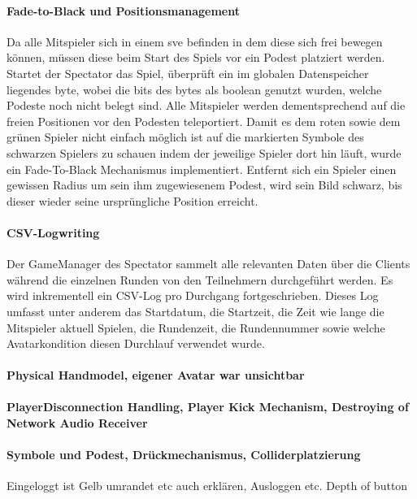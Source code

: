 \documentclass[a4paper,11pt]{article}%
\renewcommand{\\}{\vspace*{0.5\baselineskip} \newline}
\begin{document}
\paragraph{Fade-to-Black und Positionsmanagement}
	Da alle Mitspieler sich in einem \ac{sve} befinden in dem diese sich frei bewegen können, müssen diese beim Start des Spiels vor ein Podest platziert werden. Startet der Spectator das Spiel, überprüft ein im globalen Datenspeicher liegendes byte, wobei die bits des bytes als boolean genutzt wurden, welche Podeste noch nicht belegt sind. Alle Mitspieler werden dementsprechend auf die freien Positionen vor den Podesten teleportiert.
Damit es dem roten sowie dem grünen Spieler nicht einfach möglich ist auf die markierten Symbole des schwarzen Spielers zu schauen indem der jeweilige Spieler dort hin läuft, wurde ein Fade-To-Black Mechanismus implementiert. Entfernt sich ein Spieler einen gewissen Radius um sein ihm zugewiesenem Podest, wird sein Bild schwarz, bis dieser wieder seine ursprüngliche Position erreicht.

\paragraph{CSV-Logwriting}
Der GameManager des Spectator sammelt alle relevanten Daten über die Clients während die einzelnen Runden von den Teilnehmern durchgeführt werden. Es wird inkrementell ein CSV-Log pro Durchgang fortgeschrieben. Dieses Log umfasst unter anderem das Startdatum, die Startzeit, die Zeit wie lange die Mitspieler aktuell Spielen, die Rundenzeit, die Rundennummer %
sowie welche Avatarkondition diesen Durchlauf verwendet wurde.

\paragraph{Physical Handmodel, eigener Avatar war unsichtbar}

\paragraph{PlayerDisconnection Handling, Player Kick Mechanism, Destroying of Network Audio Receiver}

\paragraph{Symbole und Podest, Drückmechanismus, Colliderplatzierung}
Eingeloggt ist Gelb umrandet etc auch erklären, Ausloggen etc. Depth of button
\end{document}

